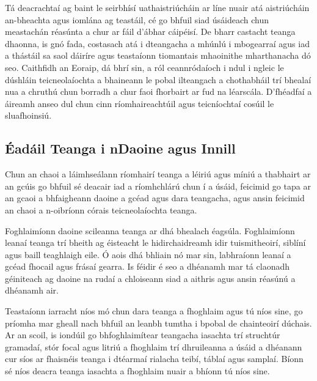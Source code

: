 \begin{multicols}{2}

Tá deacrachtaí ag baint le seirbhísí uathaistriúcháin ar líne nuair atá aistriúcháin an-bheachta agus iomlána ag teastáil, cé go bhfuil siad úsáideach chun meastachán réasúnta a chur ar fáil d’ábhar cáipéisí. De bharr castacht teanga dhaonna, is gnó fada, costasach atá i dteangacha a mhúnlú i mbogearraí agus iad a thástáil sa saol dáiríre agus teastaíonn tiomantais mhaoinithe mharthanacha dó seo. Caithfidh an Eoraip, dá bhrí sin, a ról ceannródaíoch i ndul i ngleic le dúshláin teicneolaíochta a bhaineann le pobal ilteangach a chothabháil trí bhealaí nua a chruthú chun borradh a chur faoi fhorbairt ar fud na léarscála. D’fhéadfaí a áireamh anseo dul chun cinn ríomhaireachtúil agus teicníochtaí cosúil le sluafhoinsiú.

\subsection{Éadáil Teanga i nDaoine agus Innill}

Chun an chaoi a láimhseálann ríomhairí teanga a léiriú agus míniú a thabhairt ar an gcúis go bhfuil sé deacair iad a ríomhchlárú chun í a úsáid, feicimid go tapa ar an gcaoi a bhfaigheann daoine a gcéad agus dara teangacha, agus ansin feicimid an chaoi a n-oibríonn córais teicneolaíochta teanga.

Foghlaimíonn daoine scileanna teanga ar dhá bhealach éagsúla. Foghlaimíonn leanaí teanga trí bheith ag éisteacht le hidirchaidreamh idir tuismitheoirí, siblíní agus baill teaghlaigh eile. Ó aois dhá bhliain nó mar sin, labhraíonn leanaí a gcéad fhocail agus frásaí gearra. Is féidir é seo a dhéanamh mar tá claonadh géiniteach ag daoine na rudaí a chloiseann siad a aithris agus ansin réasúnú a dhéanamh air. 


Teastaíonn iarracht níos mó chun dara teanga a fhoghlaim agus tú níos sine, go príomha mar gheall nach bhfuil an leanbh tumtha i bpobal de chainteoirí dúchais. Ar an scoil, is iondúil go bhfoghlaimítear teangacha iasachta trí struchtúr gramadaí, stór focal agus litriú a fhoghlaim trí dhruileanna a úsáid a dhéanann cur síos ar fhaisnéis teanga i dtéarmaí rialacha teibí, táblaí agus samplaí. Bíonn sé níos deacra teanga iasachta a fhoghlaim nuair a bhíonn tú níos sine. 


\end{multicols}
